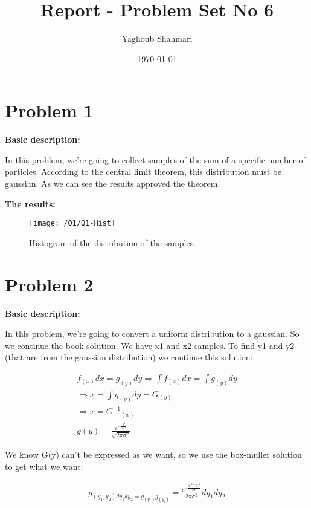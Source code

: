 \documentclass{article}
\author{Yaghoub Shahmari}
\title{Report - Problem Set No 6}
\date{\today}
\begin{document}
    \maketitle
    \section*{Problem 1}
    \textbf{Basic description:}

    In this problem, we're going to collect samples of the sum of a specific number of particles.
    According to the central limit theorem, this distribution must be gaussian.
    As we can see the results approved the theorem.

    \textbf{The results:}

    \begin{figure}[!htb]
        \centering
        \texttt{[image: /Q1/Q1-Hist]}
        \label{fig:1.1}
        \caption{Histogram of the distribution of the samples.}
    \end{figure}

    \pagebreak

    \section*{Problem 2}
    \textbf{Basic description:}

    In this problem, we're going to convert a uniform distribution to a gaussian.
    So we continue the book solution. We have x1 and x2 samples.
    To find y1 and y2 (that are from the gaussian distribution) we continue this solution:

    \begin{gather*}
        f_{(x)} dx=g_{(y)} dy \Rightarrow \int f_{(x)} dx = \int g_{(y)} dy\\
        \Rightarrow x = \int g_{(y)} dy = G_{(y)}\\
        \Rightarrow x = {G^{-1}}_{(x)}\\
        g(y) = \frac{e^{-\frac{y^2}{2\sigma^2}}}{\sqrt{2\pi\sigma^2}}
    \end{gather*}

    We know G(y) can't be expressed as we want,
    so we use the box-muller solution to get what we want:

    \begin{gather*}
        g_{(y_1,y_2)dy_1 dy_2 = g_{(y_1)}g_{(y_1)}} = \frac{e^{-\frac{{y_1}^2 + {y_2}^2}{2\sigma^2}}}{2\pi\sigma^2} dy_1 dy_2
    \end{gather*}
\end{document}

